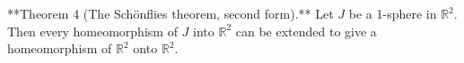 **Theorem 4 (The Schönflies theorem, second form).** Let $J$ be a 1-sphere in $\mathbb{R}^2$. Then every homeomorphism of $J$ into $\mathbb{R}^2$ can be extended to give a homeomorphism of $\mathbb{R}^2$ onto $\mathbb{R}^2$.
